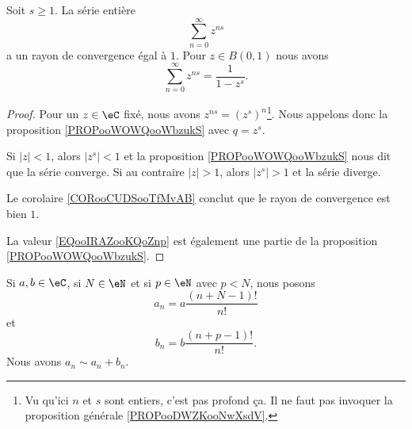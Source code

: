 \begin{lemma}       \label{LEMooRJOKooPJGVTr}
	Soit \( s\geq 1\). La série entière
	\begin{equation}
		\sum_{n=0}^{\infty}z^{ns}
	\end{equation}
	a un rayon de convergence égal à \( 1\). Pour \(z\in B(0,1)\) nous avons
	\begin{equation}        \label{EQooIRAZooKQoZnp}
		\sum_{n=0}^{\infty}z^{ns}=\frac{1}{ 1-z^s }.
	\end{equation}
\end{lemma}

\begin{proof}
	Pour un \( z\in \eC\) fixé, nous avons \( z^{ns}=(z^s)^n\)\footnote{Vu qu'ici \( n\) et \( s\) sont entiers, c'est pas profond ça. Il ne faut pas invoquer la proposition générale \ref{PROPooDWZKooNwXsdV}.}. Nous appelons donc la proposition \ref{PROPooWOWQooWbzukS} avec \( q=z^s\).

	Si \( | z |<1\), alors \( | z^s |<1\) et la proposition \ref{PROPooWOWQooWbzukS} nous dit que la série converge. Si au contraire \( | z |>1\), alors \( | z^s |>1\) et la série diverge.

	Le corolaire \ref{CORooCUDSooTfMvAB} conclut que le rayon de convergence est bien \( 1\).

	La valeur \eqref{EQooIRAZooKQoZnp} est également une partie de la proposition \ref{PROPooWOWQooWbzukS}.
\end{proof}


\begin{lemma}       \label{LEMooVMLEooCzPuKy}
	Si \( a,b\in \eC\), si \( N\in \eN\) et si \( p\in \eN\) avec \( p<N\), nous posons
	\begin{equation}
		a_n=a\frac{ (n+N-1)! }{ n! }
	\end{equation}
	et
	\begin{equation}
		b_n=b\frac{ (n+p-1)! }{ n! }.
	\end{equation}
	Nous avons \( a_n\sim a_n+b_n\).
\end{lemma}


